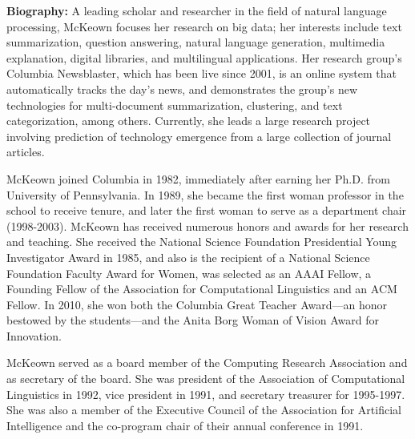 \vfill
\noindent
{\bfseries Biography:} A leading scholar and researcher in the field of natural language processing,
McKeown focuses her research on big data; her interests include text summarization, question
answering, natural language generation, multimedia explanation, digital libraries, and multilingual
applications. Her research group's Columbia Newsblaster, which has been live since 2001, is an
online system that automatically tracks the day's news, and demonstrates the group's new
technologies for multi-document summarization, clustering, and text categorization, among
others. Currently, she leads a large research project involving prediction of technology emergence
from a large collection of journal articles.

McKeown joined Columbia in 1982, immediately after earning her Ph.D. from University of Pennsylvania. In 1989, she became the first woman professor in the school to receive tenure, and later the first woman to serve as a department chair (1998-2003). McKeown has received numerous honors and awards for her research and teaching. She received the National Science Foundation Presidential Young Investigator Award in 1985, and also is the recipient of a National Science Foundation Faculty Award for Women, was selected as an AAAI Fellow, a Founding Fellow of the Association for Computational Linguistics and an ACM Fellow. In 2010, she won both the Columbia Great Teacher Award—an honor bestowed by the students—and the Anita Borg Woman of Vision Award for Innovation.

McKeown served as a board member of the Computing Research Association and as secretary of the board. She was president of the Association of Computational Linguistics in 1992, vice president in 1991, and secretary treasurer for 1995-1997. She was also a member of the Executive Council of the Association for Artificial Intelligence and the co-program chair of their annual conference in 1991.

\newpage
